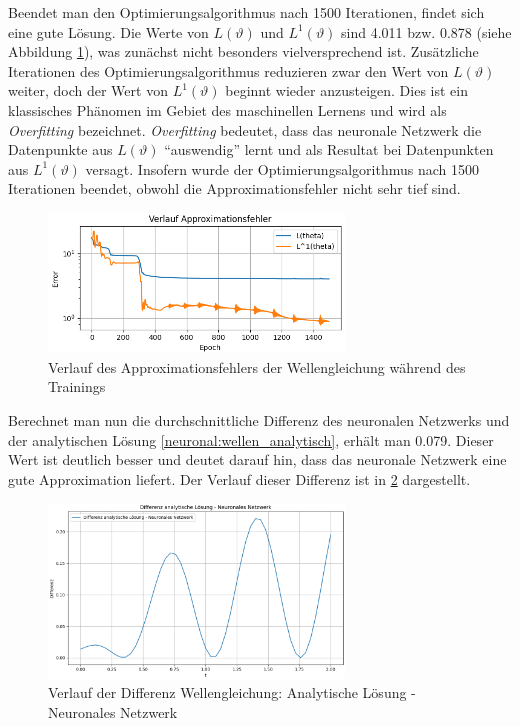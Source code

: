 Beendet man den Optimierungsalgorithmus nach 1500 Iterationen, findet sich eine gute Lösung.
Die Werte von $L(\vartheta)$ und $L^1(\vartheta)$ sind 4.011 bzw. 0.878 (siehe Abbildung \ref{fig:fehler_wave_good}), was zunächst nicht besonders vielversprechend ist.
Zusätzliche Iterationen des Optimierungsalgorithmus reduzieren zwar den Wert von $L(\vartheta)$ weiter, doch der Wert von $L^1(\vartheta)$ beginnt wieder anzusteigen.
Dies ist ein klassisches Phänomen im Gebiet des maschinellen Lernens und wird als \emph{Overfitting} bezeichnet.
\emph{Overfitting} bedeutet, dass das neuronale Netzwerk die Datenpunkte aus $L(\vartheta)$ ``auswendig'' lernt und als Resultat bei Datenpunkten aus $L^1(\vartheta)$ versagt.
Insofern wurde der Optimierungsalgorithmus nach 1500 Iterationen beendet, obwohl die Approximationsfehler nicht sehr tief sind.
\begin{figure}
    \centering
    \hspace*{-0.1\textwidth}
    \includegraphics[width=0.7\textwidth]{papers/neuronal/images/approximation_error_wave_good.png}
    \caption{Verlauf des Approximationsfehlers der Wellengleichung während des Trainings}
    \label{fig:fehler_wave_good}
\end{figure}

Berechnet man nun die durchschnittliche Differenz des neuronalen Netzwerks und der analytischen Lösung \eqref{neuronal:wellen_analytisch}, erhält man 0.079.
Dieser Wert ist deutlich besser und deutet darauf hin, dass das neuronale Netzwerk eine gute Approximation liefert. 
Der Verlauf dieser Differenz ist in \ref{fig:differenz_wellen} dargestellt.
\begin{figure}
    \centering
    \includegraphics[width=0.7\textwidth]{papers/neuronal/images/wellen_analytisch_neuronal.png}
    \caption{Verlauf der Differenz Wellengleichung: Analytische Lösung - Neuronales Netzwerk}
    \label{fig:differenz_wellen}
\end{figure}

